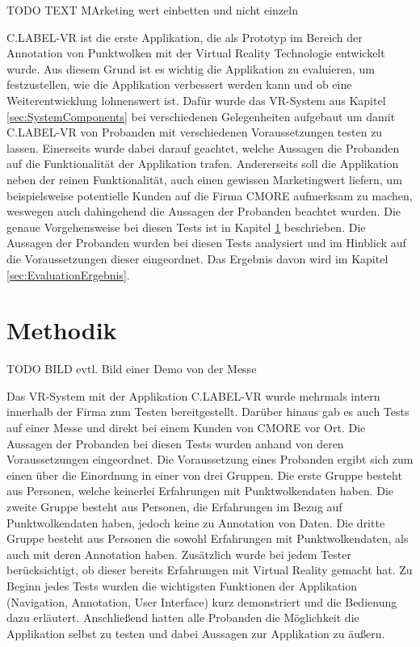 TODO TEXT MArketing wert einbetten und nicht einzeln

C.LABEL-VR ist die erste Applikation, die als Prototyp im Bereich der Annotation von Punktwolken mit der Virtual Reality Technologie entwickelt wurde. Aus diesem Grund ist es wichtig die Applikation zu evaluieren, um festzustellen, wie die Applikation verbessert werden kann und ob eine Weiterentwicklung lohnenswert ist. Dafür wurde das VR-System aus Kapitel \ref{sec:SystemComponents} bei verschiedenen Gelegenheiten aufgebaut um damit C.LABEL-VR von Probanden mit verschiedenen Voraussetzungen testen zu lassen. Einerseits wurde dabei darauf geachtet, welche Aussagen die Probanden auf die Funktionalität der Applikation trafen. Andererseits soll die Applikation neben der reinen Funktionalität, auch einen gewissen Marketingwert liefern, um beispielsweise potentielle Kunden auf die Firma CMORE aufmerksam zu machen, weswegen auch dahingehend die Aussagen der Probanden beachtet wurden. Die genaue Vorgehensweise bei diesen Tests ist in Kapitel \ref{sec:Methodik} beschrieben. Die Aussagen der Probanden wurden bei diesen Tests analysiert und im Hinblick auf die Voraussetzungen dieser eingeordnet. Das Ergebnis davon wird im Kapitel \ref{sec:EvaluationErgebnis}.

\section{Methodik}
\label{sec:Methodik}
TODO BILD evtl. Bild einer Demo von der Messe 

Das VR-System mit der Applikation C.LABEL-VR wurde mehrmals intern innerhalb der Firma zum Testen bereitgestellt. Darüber hinaus gab es auch Tests auf einer Messe und direkt bei einem Kunden von CMORE vor Ort. Die Aussagen der Probanden bei diesen Tests wurden anhand von deren Voraussetzungen eingeordnet. Die Voraussetzung eines Probanden ergibt sich zum einen über die Einordnung in einer von drei Gruppen. Die erste Gruppe besteht aus Personen, welche keinerlei Erfahrungen mit Punktwolkendaten haben. Die zweite Gruppe besteht aus Personen, die Erfahrungen im Bezug auf Punktwolkendaten haben, jedoch keine zu Annotation von Daten. Die dritte Gruppe besteht aus Personen die sowohl Erfahrungen mit Punktwolkendaten, als auch mit deren Annotation haben. Zusätzlich wurde bei jedem Tester berücksichtigt, ob dieser bereits Erfahrungen mit Virtual Reality gemacht hat. Zu Beginn jedes Tests wurden die wichtigsten Funktionen der Applikation (Navigation, Annotation, User Interface) kurz demonstriert und die Bedienung dazu erläutert. Anschließend hatten alle Probanden die Möglichkeit die Applikation selbst zu testen und dabei Aussagen zur Applikation zu äußern.\\

